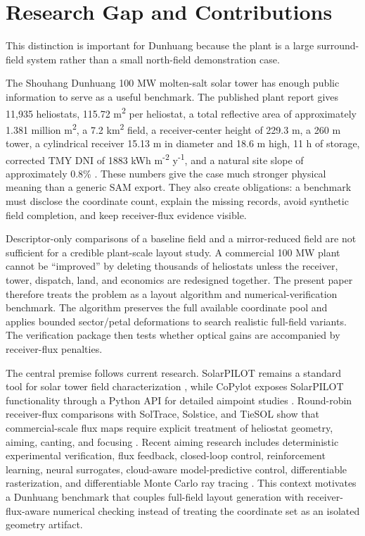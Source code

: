 \documentclass[final,3p,times]{elsarticle}
\begin{document}
\section{Research Gap and Contributions}
This distinction is important for Dunhuang because the plant is a large surround-field system rather than a small north-field demonstration case.

The Shouhang Dunhuang 100 MW molten-salt solar tower has enough public information to serve as a useful benchmark. The published plant report gives 11,935 heliostats, 115.72 m\textsuperscript{2} per heliostat, a total reflective area of approximately 1.381 million m\textsuperscript{2}, a 7.2 km\textsuperscript{2} field, a receiver-center height of 229.3 m, a 260 m tower, a cylindrical receiver 15.13 m in diameter and 18.6 m high, 11 h of storage, corrected TMY DNI of 1883 kWh m\textsuperscript{-2} y\textsuperscript{-1}, and a natural site slope of approximately 0.8\% \cite{huang2024dunhuang}. These numbers give the case much stronger physical meaning than a generic SAM export. They also create obligations: a benchmark must disclose the coordinate count, explain the missing records, avoid synthetic field completion, and keep receiver-flux evidence visible.

Descriptor-only comparisons of a baseline field and a mirror-reduced field are not sufficient for a credible plant-scale layout study. A commercial 100 MW plant cannot be ``improved'' by deleting thousands of heliostats unless the receiver, tower, dispatch, land, and economics are redesigned together. The present paper therefore treats the problem as a layout algorithm and numerical-verification benchmark. The algorithm preserves the full available coordinate pool and applies bounded sector/petal deformations to search realistic full-field variants. The verification package then tests whether optical gains are accompanied by receiver-flux penalties.

The central premise follows current research. SolarPILOT remains a standard tool for solar tower field characterization \cite{wagner2018solarpilot,nrel2025solarpilotdocs}, while CoPylot exposes SolarPILOT functionality through a Python API for detailed aimpoint studies \cite{hamilton2022copilot}. Round-robin receiver-flux comparisons with SolTrace, Solstice, and TieSOL show that commercial-scale flux maps require explicit treatment of heliostat geometry, aiming, canting, and focusing \cite{mitchell2025roundrobin}. Recent aiming research includes deterministic experimental verification, flux feedback, closed-loop control, reinforcement learning, neural surrogates, cloud-aware model-predictive control, differentiable rasterization, and differentiable Monte Carlo ray tracing \cite{sanchez2024experimental,acosta2021fluxfeedback,oberkirsch2023closedloop,cruz2022rl,carballo2025rl,alcantara2025nn,wu2026mlmpc,zheng2025diffneg,lin2025dmcrt}. This context motivates a Dunhuang benchmark that couples full-field layout generation with receiver-flux-aware numerical checking instead of treating the coordinate set as an isolated geometry artifact.
\end{document}
